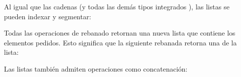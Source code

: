 \documentclass[a5paper,10pt,spanish]{sphinxmanual}
\begin{document}
\begin{sphinxVerbatim}[commandchars=\\\{\}]
  \PYG{p}{[}    \PYG{p}{]}
\end{sphinxVerbatim}

\sphinxAtStartPar
Al igual que las cadenas (y todas las demás tipos integrados {\hyperref[\detokenize{glossary:term-sequence}]{}}), las listas se pueden indexar y segmentar:

\begin{sphinxVerbatim}[commandchars=\\\{\}]
\PYG{p}{[}\PYG{p}{]}  
\PYG{p}{[}\PYG{p}{]}
\PYG{p}{[}\PYG{p}{]}  
\end{sphinxVerbatim}

\sphinxAtStartPar
Todas las operaciones de rebanado retornan una nueva lista que contiene los elementos pedidos. Esto significa que la siguiente rebanada retorna una  de la lista:

\begin{sphinxVerbatim}[commandchars=\\\{\}]
\PYG{p}{[}\PYG{p}{]}
\end{sphinxVerbatim}

\sphinxAtStartPar
Las listas también admiten operaciones como concatenación:

\begin{sphinxVerbatim}[commandchars=\\\{\}]
  \PYG{p}{[}    \PYG{p}{]}
\end{sphinxVerbatim}
\end{document}
